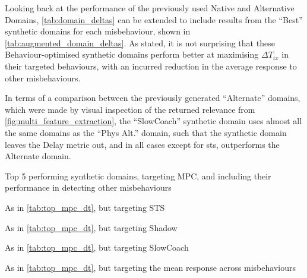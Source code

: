 Looking back at the performance of the previously used Native and Alternative Domains, \autoref{tab:domain_deltas} can be extended to include results from the ``Best'' synthetic domains for each misbehaviour, shown in \autoref{tab:augmented_domain_deltas}.
As stated, it is not surprising that these Behaviour-optimised synthetic domains perform better at maximising $\Delta T_{ix}$ in their targeted behaviours, with an incurred reduction in the average response to other misbehaviours. 

In terms of a comparison between the previously generated ``Alternate'' domains, which were made by visual inspection of the returned relevance from \autoref{fig:multi_feature_extraction}, the ``SlowCoach'' synthetic domain uses almost all the same domains as the ``Phys Alt.'' domain, such that the synthetic domain leaves the Delay metric out, and in all cases except for \gls{sts}, outperforms the Alternate domain.


\begin{table}
	\centering
	\caption{Top 5 performing synthetic domains, targeting MPC, and including their performance in detecting other misbehaviours}
	\centerline{}
	\label{tab:top_mpc_dt}
\end{table}
\begin{table}
	\centering
	\caption{As in \autoref{tab:top_mpc_dt}, but targeting STS}
	\centerline{}
	\label{tab:top_sts_dt}
\end{table}
\begin{table}
	\centering
	\caption{As in \autoref{tab:top_mpc_dt}, but targeting Shadow}
	\centerline{}
	\label{tab:top_shadow_dt}
\end{table}
\begin{table}
	\centering
	\caption{As in \autoref{tab:top_mpc_dt}, but targeting SlowCoach}
	\centerline{}
	\label{tab:top_sts_dt}
\end{table}
\begin{table}
	\centering
	\caption{As in \autoref{tab:top_mpc_dt}, but targeting the mean response across misbehaviours}
	\centerline{}
	\label{tab:top_mean_dt}
\end{table}

